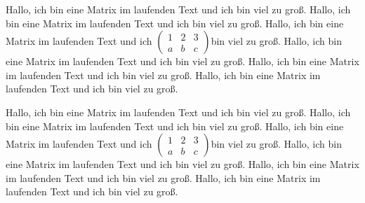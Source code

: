 \documentclass[12pt,ngerman,parskip=full]{scrartcl}
\begin{document}
Hallo, ich bin eine Matrix im laufenden Text und ich bin viel zu groß. Hallo, ich bin eine Matrix im laufenden Text und ich bin viel zu groß. Hallo, ich bin eine Matrix im laufenden Text und ich 
\(	(\begin{smallmatrix}
	1 & 2 & 3\\
	a & b & c
\end{smallmatrix})
\)bin viel zu groß. Hallo, ich bin eine Matrix im laufenden Text und ich bin viel zu groß. Hallo, ich bin eine Matrix im laufenden Text und ich bin viel zu groß. Hallo, ich bin eine Matrix im laufenden Text und ich bin viel zu groß. 

Hallo, ich bin eine Matrix im laufenden Text und ich bin viel zu groß. Hallo, ich bin eine Matrix im laufenden Text und ich bin viel zu groß. Hallo, ich bin eine Matrix im laufenden Text und ich 
\(	\left(\begin{smallmatrix}
	1 & 2 & 3\\
	a & b & c
\end{smallmatrix}\right) 
\)bin viel zu groß. Hallo, ich bin eine Matrix im laufenden Text und ich bin viel zu groß. Hallo, ich bin eine Matrix im laufenden Text und ich bin viel zu groß. Hallo, ich bin eine Matrix im laufenden Text und ich bin viel zu groß. 
\end{document}
